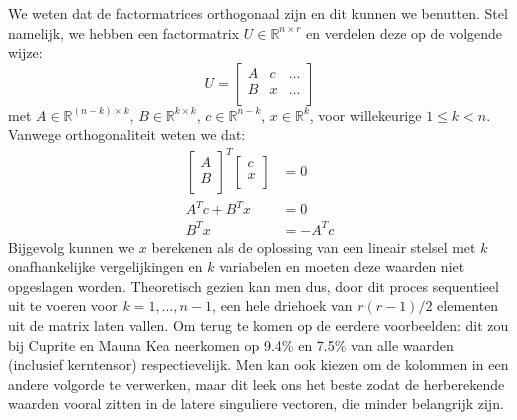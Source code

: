 We weten dat de factormatrices orthogonaal zijn en dit kunnen we benutten. Stel namelijk, we hebben een factormatrix $U \in \mathbb{R}^{n \times r}$ en verdelen deze op de volgende wijze:
\[
U = \begin{bmatrix}
A & c & \dots \\
B & x & \dots \\
\end{bmatrix}
\]
met $A \in \mathbb{R}^{(n-k) \times k}$, $B \in \mathbb{R}^{k \times k}$, $c \in \mathbb{R}^{n-k}$, $x \in \mathbb{R}^{k}$, voor willekeurige $1 \leq k < n$. Vanwege orthogonaliteit weten we dat:
\begin{align*}
\begin{bmatrix}
A \\
B \\
\end{bmatrix}^T
\begin{bmatrix}
c \\
x \\
\end{bmatrix}
&= 0 \\
A^T c + B^T x &= 0 \\
B^T x &= -A^T c
\end{align*}
Bijgevolg kunnen we $x$ berekenen als de oplossing van een lineair stelsel met $k$ onafhankelijke vergelijkingen en $k$ variabelen en moeten deze waarden niet opgeslagen worden. Theoretisch gezien kan men dus, door dit proces sequentieel uit te voeren voor $k = 1, \dots, n - 1$, een hele driehoek van $r (r - 1)/2$ elementen uit de matrix laten vallen. Om terug te komen op de eerdere voorbeelden: dit zou bij Cuprite en Mauna Kea neerkomen op 9.4\% en 7.5\% van alle waarden (inclusief kerntensor) respectievelijk. Men kan ook kiezen om de kolommen in een andere volgorde te verwerken, maar dit leek ons het beste zodat de herberekende waarden vooral zitten in de latere singuliere vectoren, die minder belangrijk zijn.